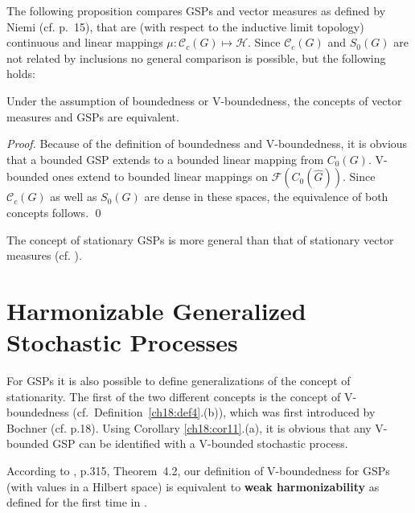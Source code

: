 \documentclass[graybox]{svmult}
\begin{document}
The following proposition compares GSPs and vector measures as
defined by Niemi (cf.  \cite{ni75} p.~15), that are (with respect to
the inductive limit topology) continuous and linear mappings $\mu :
\mathcal{C}_c(G) \mapsto \mathcal{H}$.  Since $\mathcal{C}_c(G)$ and ${S_{0}(G)}$ are
not related by inclusions no general comparison is possible, but the
following holds:

\setcounter{proposition}{11}
\begin{proposition}\label{ch18:pro12}
Under the assumption of boundedness or V-boundedness, the concepts of vector
measures and GSPs are equivalent.
\end{proposition}

\begin{proof}
Because of the definition of boundedness and V-boundedness, it is obvious that a
bounded GSP extends to a bounded linear mapping from $C_{0}(G)$.
V-bounded ones extend to bounded linear mappings on $\mathcal{F}(C_{0}(\hat{G}))$.  Since $\mathcal{C}_c(G)$ as well as ${S_{0}(G)}$ are
dense in these spaces, the equivalence of both concepts follows.  \qed
\end{proof}

\begin{rem}
The concept of stationary GSPs is more general than that of
stationary vector measures (cf.  \cite{ho89}).
\end{rem}


\section{Harmonizable Generalized Stochastic Processes}
\label{ch18:sec6}

For GSPs it is also possible to define generalizations of the
concept of stationarity.  The first of the two different concepts is the
concept of V-boundedness (cf.~Definition~\ref{ch18:def4}.(b)), which was first  introduced by Bochner (cf.  \cite{bo56} p.18).
Using Corollary \ref{ch18:cor11}.(a), it is obvious that any V-bounded GSP can be
identified with a V-bounded stochastic process.

\begin{rem}
According to
\cite{ra82-1}, p.315, Theorem~4.2, our definition of V-boundedness for GSPs
(with values in a Hilbert space) is equivalent to \textbf{weak
harmonizability} as defined for the first time in \cite{ro59}.
\end{rem}
\end{document}
